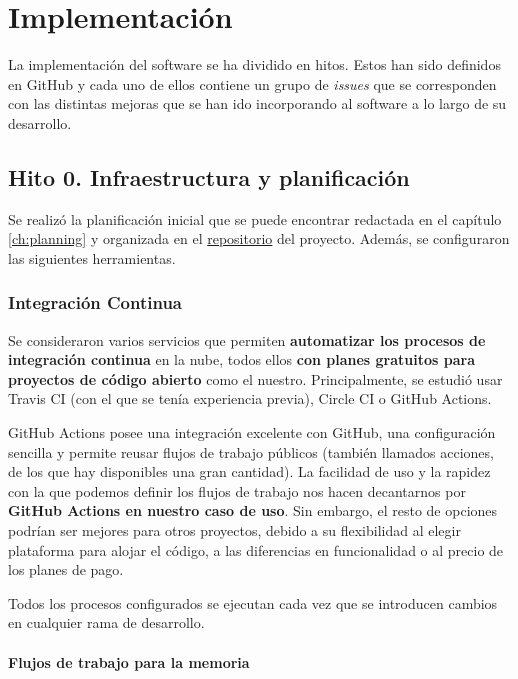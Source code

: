 \chapter{Implementación}

La implementación del software se ha dividido en hitos. Estos han sido definidos en GitHub
y cada uno de ellos contiene un grupo de \textit{issues} que se corresponden con las distintas
mejoras que se han ido incorporando al software a lo largo de su desarrollo.

\section{Hito 0. Infraestructura y planificación}

Se realizó la planificación inicial que se puede encontrar redactada en el capítulo \ref{ch:planning} y organizada en el \href{https://github.com/dipzza/ultrastar-song2txt}{repositorio} del proyecto. Además, se configuraron las siguientes herramientas.


\subsection{Integración Continua}

Se consideraron varios servicios que permiten \textbf{automatizar los procesos de integración continua} en la nube, todos ellos \textbf{con planes gratuitos para proyectos de código abierto} como el nuestro. Principalmente, se estudió usar Travis CI (con el que se tenía experiencia previa), Circle CI o GitHub Actions.

GitHub Actions posee una integración excelente con GitHub, una configuración sencilla y permite reusar flujos de trabajo públicos (también llamados acciones, de los que hay disponibles una gran cantidad). La facilidad de uso y la rapidez con la que podemos definir los flujos de trabajo nos hacen decantarnos por \textbf{GitHub Actions en nuestro caso de uso}. Sin embargo, el resto de opciones podrían ser mejores para otros proyectos, debido a su flexibilidad al elegir plataforma para alojar el código, a las diferencias en funcionalidad o al precio de los planes de pago.

Todos los procesos configurados se ejecutan cada vez que se introducen cambios en cualquier rama de desarrollo.

\subsubsection{Flujos de trabajo para la memoria}

